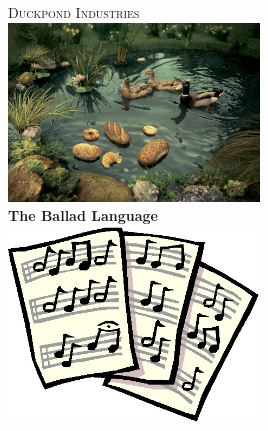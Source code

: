 \documentclass{article}
\begin{document}
\begin{titlepage}
	\begin{center}
		\textsc{\LARGE Duckpond Industries}\\[1.5cm]
		\includegraphics[width=0.5\textwidth]{duckpond.jpg}
		\\[\baselineskip]
		{ \huge \bfseries The Ballad Language} \\[0.4cm]
		\includegraphics[width=0.5\textwidth]{score.jpg}
		\vfill
	\end{center}
\end{titlepage}


\end{document}
